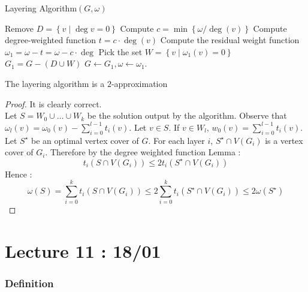 \documentclass[12pt]{cours}
\begin{document}
\begin{algorithm}
    \caption{Layering Algorithm$(G, \omega)$}
    \begin{algorithmic}
            \State Remove $D = \left\{v \mid \deg v = 0\right\}$
            \State Compute $c = \min \left\{\omega/\deg(v)\right\}$
            \State Compute degree-weighted function $t = c \cdot \deg(v)$
            \State Compute the residual weight function $\omega_{1} = \omega - t = \omega- c \cdot \deg$
            \State Pick the set $W = \left\{v \mid \omega_{1}(v) = 0\right\}$
            \State $G_{1} = G - \left(D \cup W\right)$
            \State $G \gets G_{1}, \omega \gets \omega_{1}$.
        \EndWhile
    \end{algorithmic}
\end{algorithm}

\begin{theorem}
    The layering algorithm is a $2$-approximation
\end{theorem}
\begin{proof}
    It is clearly correct.\\
    Let $S = W_{0} \cup \ldots \cup W_{k}$ be the solution output by the algorithm. Observe that $\omega_{l}(v) = \omega_{0}(v) - \sum_{i = 0}^{l- 1}t_{i}(v)$. Let $v \in S$. If $v \in W_{l}$, $w_{0}(v) = \sum_{i = 0}^{l - 1}t_{i}(v)$.\\
    Let $S^{\star}$ be an optimal vertex cover of $G$. For each layer $i$, $S^{\star} \cap V\left(G_{i}\right)$ is a vertex cover of $G_{i}$. Therefore by the degree weighted function Lemma :
    \[
        t_{i}\left(S\cap V(G_{i})\right) \leq 2 t_{i}\left(S^{\star} \cap V(G_{i})\right)
    \]
    Hence :
    \[
        \omega(S) = \sum_{i = 0}^{k} t_{i}\left(S \cap V(G_{i})\right) \leq 2 \sum_{i = 0}^{k} t_{i}(S^{\star} \cap V(G_{i})) \leq 2 \omega(S^{\star})
    \]
\end{proof}
\part[Linear Programming]{Lecture 11 : 18/01}
\section{Definition}
\end{document}
